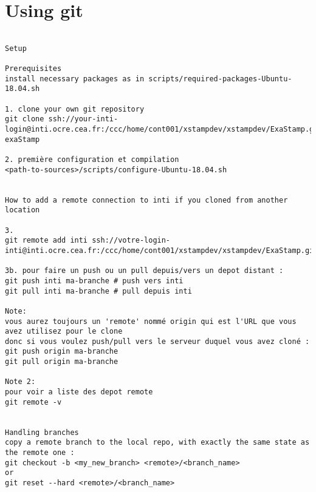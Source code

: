 \section{Using git}
\label{sec:install}

\begin{verbatim}

Setup

Prerequisites
install necessary packages as in scripts/required-packages-Ubuntu-18.04.sh

1. clone your own git repository
git clone ssh://your-inti-login@inti.ocre.cea.fr:/ccc/home/cont001/xstampdev/xstampdev/ExaStamp.git exaStamp

2. première configuration et compilation
<path-to-sources>/scripts/configure-Ubuntu-18.04.sh


How to add a remote connection to inti if you cloned from another location

3. 
git remote add inti ssh://votre-login-inti@inti.ocre.cea.fr:/ccc/home/cont001/xstampdev/xstampdev/ExaStamp.git

3b. pour faire un push ou un pull depuis/vers un depot distant :
git push inti ma-branche # push vers inti
git pull inti ma-branche # pull depuis inti

Note:
vous aurez toujours un 'remote' nommé origin qui est l'URL que vous avez utilisez pour le clone
donc si vous voulez push/pull vers le serveur duquel vous avez cloné :
git push origin ma-branche
git pull origin ma-branche

Note 2:
pour voir a liste des depot remote
git remote -v


Handling branches
copy a remote branch to the local repo, with exactly the same state as the remote one :
git checkout -b <my_new_branch> <remote>/<branch_name>
or
git reset --hard <remote>/<branch_name>

\end{verbatim}


